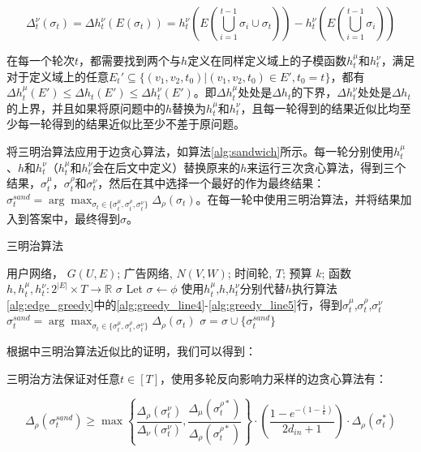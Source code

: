 \begin{equation}
\Delta_t^\nu(\sigma_t)=\Delta h_t^\nu(E(\sigma_t))=h_t^\nu(E(\bigcup_{i=1}^{t-1}{\sigma_i} \cup \sigma_t)) - h_t^\nu(E(\bigcup_{i=1}^{t-1}{\sigma_i}))
\end{equation}

在每一个轮次$t$，都需要找到两个与$h$定义在同样定义域上的子模函数$h_t^\mu$和$h_t^\nu$，满足对于定义域上的任意$E_t' \subseteq \{(v_1,v_2,t_0)|(v_1,v_2,t_0)\in E',t_0=t\}$，都有$\Delta h_t^\mu(E') \le \Delta h_t(E') \le \Delta h_t^\nu(E')$。即$\Delta h_t^\mu$处处是$\Delta h_t$的下界，$\Delta h_t^\nu$处处是$\Delta h_t$的上界，并且如果将原问题中的$h$替换为$h_t^\mu$和$h_t^\nu$，且每一轮得到的结果近似比均至少每一轮得到的结果近似比至少不差于原问题。

将三明治算法应用于边贪心算法，如算法\ref{alg:sandwich}所示。每一轮分别使用$h_t^\mu$、$h$和$h_t^\nu$（$h_t^\mu$和$h_t^\nu$会在后文中定义）替换原来的$h$来运行三次贪心算法，得到三个结果，$\sigma_t^\mu$，$\sigma_t^\rho$和$\sigma_t^\nu$，然后在其中选择一个最好的作为最终结果：$\sigma_t^{sand}=\arg\max_{\sigma_t \in \{\sigma_t^\mu,\sigma_t^\rho,\sigma_t^\nu\}}\Delta_\rho(\sigma_t)$。在每一轮中使用三明治算法，并将结果加入到答案中，最终得到$\sigma$。

\begin{algorithm}
    \caption{三明治算法\label{alg:sandwich}} 
    \begin{algorithmic}[1]
        \REQUIRE 用户网络， $G(U,E)$; 广告网络, $N(V,W)$; 时间轮, $T$; 预算 $k$; 函数 $h,h_t^\mu,h_t^\nu:2^{|E|} \times T \to \mathbb{R} $
        \ENSURE $\sigma$
        \STATE Let $\sigma \gets \phi$
            \STATE 使用$h_t^\mu$,$h$,$h_t^\nu$分别代替$h$执行算法\ref{alg:edge_greedy}中的\ref{alg:greedy_line4}-\ref{alg:greedy_line5}行，得到$\sigma_t^\mu$,$\sigma_t^\rho$,$\sigma_t^\nu$
            \STATE $\sigma_t^{sand}=\arg\max_{\sigma_t \in \{\sigma_t^\mu,\sigma_t^\rho,\sigma_t^\nu\}}\Delta_\rho(\sigma_t)$
            \STATE $\sigma = \sigma \cup \{\sigma_t^{sand}\}$
        \ENDFOR
    \end{algorithmic}
\end{algorithm}

根据\parencite{sandwich}中三明治算法近似比的证明，我们可以得到：

\begin{theorem}
\label{thm:sand}
三明治方法保证对任意$t \in [T]$，使用多轮反向影响力采样的边贪心算法有：

\begin{equation}
    \Delta_\rho(\sigma_t^{sand}) \ge \max\left\{\frac{\Delta_\rho(\sigma_t^\nu)}{\Delta_\nu(\sigma_t^\nu)},\frac{\Delta_\mu(\sigma_t^{\rho*})}{\Delta_\rho(\sigma_t^{\rho*})} \right\} \cdot (\frac{1-e^{-(1-\frac{1}{k})}}{2d_{in}+1})\cdot \Delta_\rho(\sigma_t^{*})
\end{equation}
\end{theorem}

